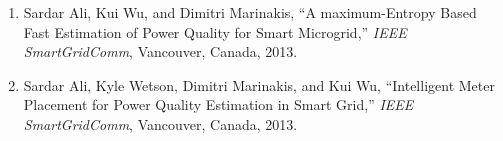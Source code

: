 \label{chap:publications}
\begin{enumerate}
\item Sardar Ali, Kui Wu, and Dimitri Marinakis, ``A maximum-Entropy Based Fast Estimation of Power Quality for Smart Microgrid,'' \textit{IEEE SmartGridComm}, Vancouver, Canada, 2013.

\item Sardar Ali, Kyle Wetson, Dimitri Marinakis, and Kui Wu, ``Intelligent Meter Placement for Power Quality Estimation in Smart Grid,'' \textit{IEEE SmartGridComm}, Vancouver, Canada, 2013.
\end{enumerate}